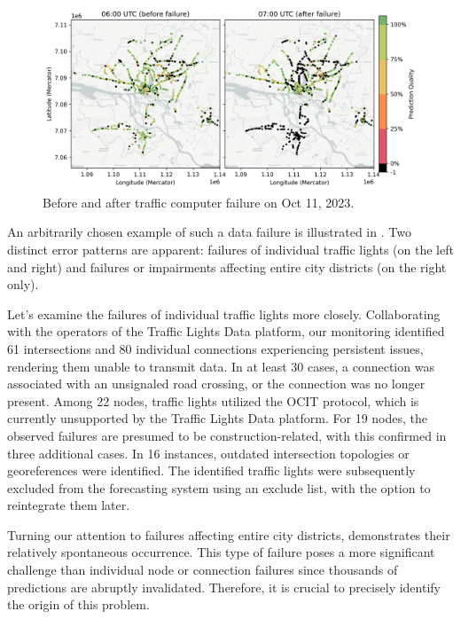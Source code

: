 \begin{figure}[t]
    \centering
    \includegraphics[width=\linewidth]{images/monitoring-before-after-failure.png}
    \caption{Before and after traffic computer failure on Oct 11, 2023.}\label{fig:monitoring-failure}
\end{figure}

An arbitrarily chosen example of such a data failure is illustrated in . Two distinct error patterns are apparent: failures of individual traffic lights (on the left and right) and failures or impairments affecting entire city districts (on the right only).

Let's examine the failures of individual traffic lights more closely. Collaborating with the operators of the Traffic Lights Data platform, our monitoring identified 61 intersections and 80 individual connections experiencing persistent issues, rendering them unable to transmit data. In at least 30 cases, a connection was associated with an unsignaled road crossing, or the connection was no longer present. Among 22 nodes, traffic lights utilized the OCIT protocol, which is currently unsupported by the Traffic Lights Data platform. For 19 nodes, the observed failures are presumed to be construction-related, with this confirmed in three additional cases. In 16 instances, outdated intersection topologies or georeferences were identified. The identified traffic lights were subsequently excluded from the forecasting system using an exclude list, with the option to reintegrate them later.

Turning our attention to failures affecting entire city districts,  demonstrates their relatively spontaneous occurrence. This type of failure poses a more significant challenge than individual node or connection failures since thousands of predictions are abruptly invalidated. Therefore, it is crucial to precisely identify the origin of this problem.

